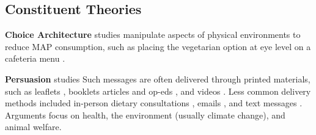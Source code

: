 \documentclass[sn-nature,referee,pdflatex]{sn-jnl}
\begin{document}
\subsection{Constituent Theories}\label{sec2.2}

\textbf{Choice Architecture} studies
\citep{andersson2021, kanchanachitra2020} manipulate aspects of physical
environments to reduce MAP consumption, such as placing the vegetarian
option at eye level on a cafeteria menu \citep{andersson2021}.

\begin{comment}
Maya suggests we put in a more representative DV
\end{comment}

\textbf{Persuasion} studies
\citep{kanchanachitra2020, abrahamse2007, acharya2004, banerjee2019, bianchi2022, bochmann2017, bschaden2020, carfora2023, hennessy2016, piester2020, cooney2014, cooney2016, feltz2022, haile2021, hatami2018, jalil2023, mathur2021effectiveness, merrill2009, norris2014, peacock2017, polanco2022, sparkman2021, weingarten2022}
Such messages are often delivered through printed materials, such as
leaflets \citep{haile2021, polanco2022}, booklets \citep{bianchi2022}
articles and op-eds \citep{sparkman2021, feltz2022}, and videos
\citep{sparkman2021, cooney2016, mathur2021effectiveness}. Less common
delivery methods included in-person dietary consultations
\citep{merrill2009}, emails \citep{banerjee2019}, and text messages
\citep{carfora2023}. Arguments focus on health, the environment (usually
climate change), and animal welfare.

\begin{comment}
Some are designed to be emotionally activating, e.g. presenting upsetting footage of factory farms [@polanco2022], while others present information more factually, for instance about the relationship between diet and cancer [@hatami2018].
Many persuasion studies combine arguments, such as a lecture on the health and environmental consequences of eating meat
These studies formed the majority of our database.
\end{comment}
\end{document}
